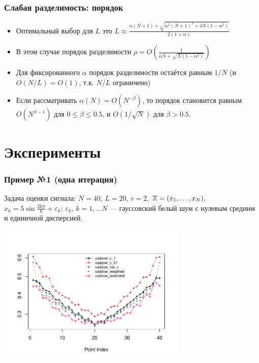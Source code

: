 \documentclass[unicode, notheorems]{beamer}
\begin{document}
\begin{frame}
	\frametitle{Слабая разделимость: порядок}
	\begin{itemize}
		\item Оптимальный выбор для $L$ это $L \approx \frac{\alpha(N + 1) + \sqrt{\alpha^2(N+1)^2 + 4N(1  - \alpha^2)}}{2(1 + \alpha)}$
		\item В этом случае порядок разделимости $\rho = O \left(\frac{1}{\alpha N + \sqrt{N(1 - \alpha ^ 2)}} \right)$
		\item Для фиксированного $\alpha$ порядок разделимости остаётся равным $1/N$ (и $O(N/L) = O(1)$, т.к. $N/L$ ограничено)
		\item Если рассматривать $\alpha(N) = O(N^{-\beta})$, то порядок становится равным $O(N^{\beta - 1})$ для $0 \le \beta \le 0.5$, и $O(1/\sqrt{N})$ для $\beta > 0.5$.
	\end{itemize}
\end{frame}

 
\section{Эксперименты}
\begin{frame}
	\frametitle{Пример №1 (одна итерация)}
	Задача оценки сигнала: $N = 40$, $L = 20$, $r = 2$, $\mathbb{X} = (x_{1}, \ldots, x_N),$  $x_k = 5\sin{\frac{2 k \pi}{6}} + \varepsilon_k$; $\varepsilon_k$, $k = 1, \ldots N$ --- гауссовский белый шум с нулевым средним и единичной дисперсией.
	\vspace{-0.8cm}
	\begin{center}
		\includegraphics*[width = 9cm]{s1_it1.pdf}
	\end{center}
	
	
\end{frame}
\end{document}
